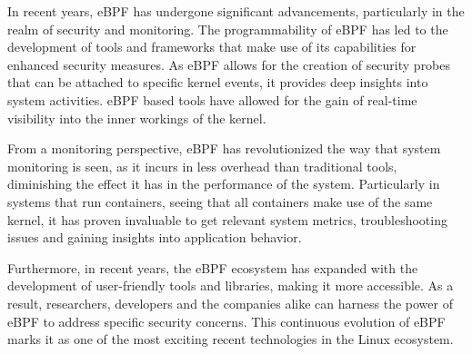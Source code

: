 In recent years, eBPF has undergone significant advancements, particularly in the realm of security and monitoring. The programmability of eBPF has led to the development of tools and frameworks that make use of its capabilities for enhanced security measures. As eBPF allows for the creation of security probes that can be attached to specific kernel events, it provides deep insights into system activities. eBPF based tools have allowed for the gain of real-time visibility into the inner workings of the kernel. 

From a monitoring perspective, eBPF has revolutionized the way that system monitoring is seen, as it incurs in less overhead than traditional tools, diminishing the effect it has in the performance of the system. Particularly in systems that run containers, seeing that all containers make use of the same kernel, it has proven invaluable to get relevant system metrics, troubleshooting issues and gaining insights into application behavior.

Furthermore, in recent years, the eBPF ecosystem has expanded with the development of user-friendly tools and libraries, making it more accessible. As a result, researchers, developers and the companies alike can harness the power of eBPF to address specific security concerns. This continuous evolution of eBPF marks it as one of the most exciting recent technologies in the Linux ecosystem.



\begin{comment}
BPF evolved to what eBPF, or extended BPF, in 2014, having several significant changes, such as:
\begin{enumerate}
    \item The BPF instruction set was overhauled to be more efficient on 64-bit machines, and the interpreter was entirely rewritten.
    \item eBPF \textit{maps} were introduced, which are data structures that can be accessed by BPF programs and by user space applications, allowing for the sharing of information between user space applications and BPF programs.
    \item The \texttt{bpf()} system call was added so that user space programs can interact with eBPF programs in the kernel.
    \item Several BPF helper functions were added
    \item The eBPF verifier was added to ensure that eBPF programs are safe to run.
\end{enumerate}

One of the biggest advancements in the eBPF toolset was made in 2020, when LSM PBF, was introduced, allowing for the attachment of eBPF programs as LSM, (Linux Security Module) kernel interface. This indicated a major use case for eBPF, bringing to light the fact that eBPF is a great platform for security tooling, in addition to networking and observability.

eBPF is capable of running custom code in the kernel. As seen above, user space applications communicate with the kernel using system calls, triggering an event which can be captured with an eBPF program. 

\end{comment}
